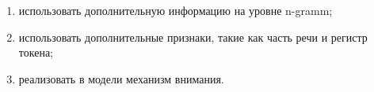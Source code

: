 \documentclass[12pt, a4paper]{article} %
\begin{document}
\begin{enumerate}
	\item использовать дополнительную информацию на уровне n-gramm;
	\item использовать дополнительные признаки, такие как часть речи и регистр токена;
	\item реализовать в модели механизм внимания.
\end{enumerate}



\newpage


\end{document}
